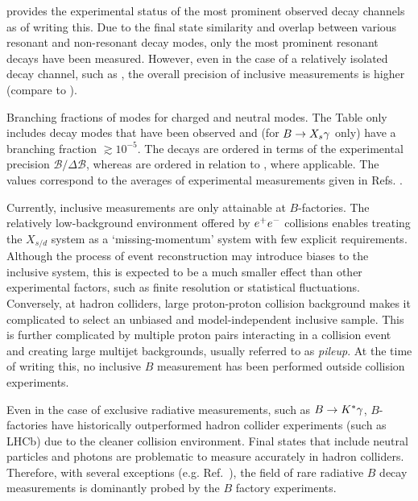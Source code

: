  provides the experimental status of the most prominent observed \BtoXsdgamma decay channels as of writing this.
Due to the final state similarity and overlap between various resonant and non-resonant decay modes, only the most prominent resonant decays have been measured.
However, even in the case of a relatively isolated decay channel, such as \BtoKstargamma, the overall precision of inclusive measurements is higher (compare to ).

{\renewcommand{\arraystretch}{1.2}
\begin{table}[hbtp!]
    \centering
    \caption{\label{tab:btosgamma_bfs} 
    Branching fractions of \BtoXsgamma modes for charged and neutral modes.
    The Table only includes decay modes that have been observed and (for $\BtoXsgamma$ only) have a branching fraction $\gtrsim10^{-5}$.
    The \Bp decays are ordered in terms of the experimental precision $\mathcal{B}/\Delta\mathcal{B}$, whereas \Bz are ordered in relation to \Bp, where applicable.
    The values correspond to the averages of experimental measurements given in Refs. \cite{Amhis:2022mac,Workman:2022ynf}.
    }
    
\end{table}
}

Currently, inclusive measurements are only attainable at $B$-factories.
The relatively low-background environment offered by $e^+e^-$ collisions enables treating the $X_{s/d}$ system as a `missing-momentum' system with few explicit requirements.
Although the process of event reconstruction may introduce biases to the inclusive system, this is expected to be a much smaller effect than other experimental factors, such as finite resolution or statistical fluctuations.
Conversely, at hadron colliders,
large proton-proton collision background makes it complicated to select an unbiased and model-independent inclusive sample.
This is further complicated by multiple proton pairs interacting in a collision event and creating large multijet backgrounds, usually referred to as \textit{pileup}.
At the time of writing this, no inclusive $B$ measurement has been performed outside \epem collision experiments.

Even in the case of exclusive radiative measurements, such as $B\rightarrow K^*\gamma$, $B$-factories have historically outperformed hadron collider experiments (such as LHCb) due to the cleaner \epem collision environment.
Final states that include neutral particles and photons are problematic to measure accurately in hadron colliders.
Therefore, with several exceptions (e.g. Ref.~\cite{Bellee:2019qbt}), the field of rare radiative $B$ decay measurements is dominantly probed by the $B$ factory experiments.



